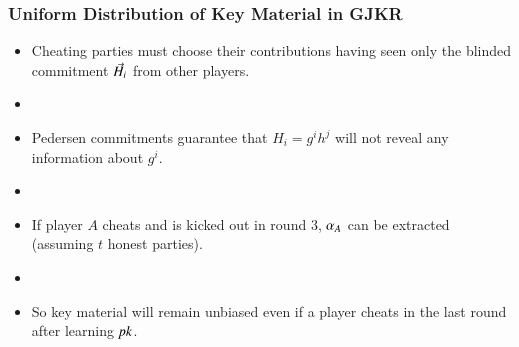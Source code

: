 \documentclass[hyperref={pdfpagelabels=true},table,dvipsnames,14pt,aspectratio=169]{beamer}
\begin{document}
\begin{frame}
  \centering
{}
\end{frame}


\begin{frame}
  \frametitle{Uniform Distribution of Key Material in GJKR}

  \begin{itemize}
    \item Cheating parties must choose their contributions having seen only the blinded commitment $\vec{H}_i$ from other players.
    \item[]
    \item<2-> Pedersen commitments guarantee that $H_i = g^ih^j$ will not reveal any information about $g^i$.
    \item[]
    \item<3-> If player $A$ cheats and is kicked out in round $3$,  $\alpha_A$ can be extracted (assuming $t$ honest parties).
    \item[]
    \item<4-> So key material will remain unbiased even if a player cheats in the last round after learning $\mathit{pk}$.
  \end{itemize}
\end{frame}
\end{document}
